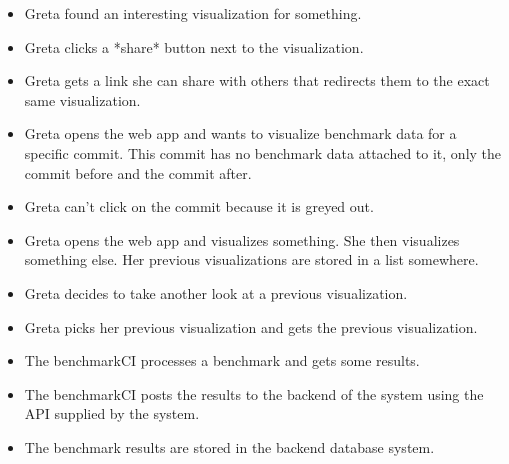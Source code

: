 \begin{itemize}
	\item Greta found an interesting \gls{visualization} for something.
	\item Greta clicks a *share* button next to the \gls{visualization}.
	\item Greta gets a link she can share with others that redirects them to the exact same \gls{visualization}.
\end{itemize}

\begin{itemize}
	\item Greta opens the web app and wants to visualize benchmark data for a specific commit. This commit has no benchmark data attached to it, only the commit before and the commit after.
	\item Greta can't click on the commit because it is greyed out.
\end{itemize}

\begin{itemize}
	\item Greta opens the web app and visualizes something. She then visualizes something else. Her previous \glspl{visualization} are stored in a list somewhere.
	\item Greta decides to take another look at a previous \gls{visualization}.
	\item Greta picks her previous visualization and gets the previous \gls{visualization}.
\end{itemize}

\begin{itemize}
	\item The benchmarkCI processes a benchmark and gets some results.
	\item The benchmarkCI posts the results to the backend of the system using the API supplied by the system.
	\item The benchmark results are stored in the backend database system.
\end{itemize}